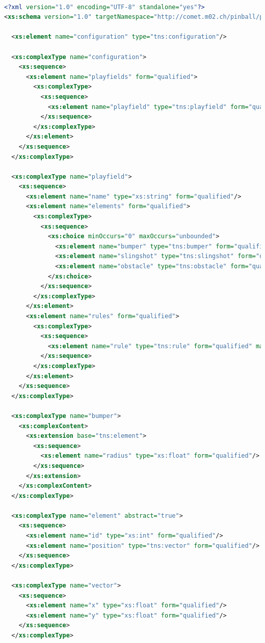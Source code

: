 \documentclass[fontsize=12pt,
               paper=a4,
               twoside=false,
               parskip=half,
               ]{scrartcl}
\begin{document}
\begin{lstlisting}[language=xml,label=lst:playfield_xsd,caption={playfield.xsd}]

<?xml version="1.0" encoding="UTF-8" standalone="yes"?>
<xs:schema version="1.0" targetNamespace="http://comet.m02.ch/pinball/playfield" xmlns:tns="http://comet.m02.ch/pinball/playfield" xmlns:xs="http://www.w3.org/2001/XMLSchema">

  <xs:element name="configuration" type="tns:configuration"/>

  <xs:complexType name="configuration">
    <xs:sequence>
      <xs:element name="playfields" form="qualified">
        <xs:complexType>
          <xs:sequence>
            <xs:element name="playfield" type="tns:playfield" form="qualified" maxOccurs="unbounded"/>
          </xs:sequence>
        </xs:complexType>
      </xs:element>
    </xs:sequence>
  </xs:complexType>

  <xs:complexType name="playfield">
    <xs:sequence>
      <xs:element name="name" type="xs:string" form="qualified"/>
      <xs:element name="elements" form="qualified">
        <xs:complexType>
          <xs:sequence>
            <xs:choice minOccurs="0" maxOccurs="unbounded">
              <xs:element name="bumper" type="tns:bumper" form="qualified"/>
              <xs:element name="slingshot" type="tns:slingshot" form="qualified"/>
              <xs:element name="obstacle" type="tns:obstacle" form="qualified"/>
            </xs:choice>
          </xs:sequence>
        </xs:complexType>
      </xs:element>
      <xs:element name="rules" form="qualified">
        <xs:complexType>
          <xs:sequence>
            <xs:element name="rule" type="tns:rule" form="qualified" maxOccurs="unbounded"/>
          </xs:sequence>
        </xs:complexType>
      </xs:element>
    </xs:sequence>
  </xs:complexType>

  <xs:complexType name="bumper">
    <xs:complexContent>
      <xs:extension base="tns:element">
        <xs:sequence>
          <xs:element name="radius" type="xs:float" form="qualified"/>
        </xs:sequence>
      </xs:extension>
    </xs:complexContent>
  </xs:complexType>

  <xs:complexType name="element" abstract="true">
    <xs:sequence>
      <xs:element name="id" type="xs:int" form="qualified"/>
      <xs:element name="position" type="tns:vector" form="qualified"/>
    </xs:sequence>
  </xs:complexType>

  <xs:complexType name="vector">
    <xs:sequence>
      <xs:element name="x" type="xs:float" form="qualified"/>
      <xs:element name="y" type="xs:float" form="qualified"/>
    </xs:sequence>
  </xs:complexType>


\end{lstlisting}
\end{document}
